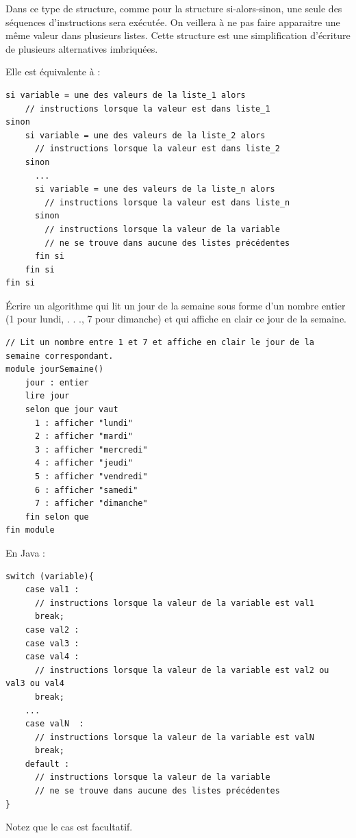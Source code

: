 \documentclass[11pt,a4paper]{article}
\begin{document}
        Dans ce type de structure, comme pour la structure si-alors-sinon, une seule des s\'equences
        d'instructions sera ex\'ecut\'ee. On veillera \`a ne pas faire apparaitre une m\^eme valeur dans
        plusieurs listes. Cette structure est une simplification d'\'ecriture de plusieurs alternatives
        imbriqu\'ees.
      
            \par
        
        Elle est \'equivalente \`a : 
      
            \par
        \begin{verbatim}
si variable = une des valeurs de la liste_1 alors
    // instructions lorsque la valeur est dans liste_1
sinon
    si variable = une des valeurs de la liste_2 alors
      // instructions lorsque la valeur est dans liste_2
    sinon
      ...
      si variable = une des valeurs de la liste_n alors
        // instructions lorsque la valeur est dans liste_n
      sinon
        // instructions lorsque la valeur de la variable
        // ne se trouve dans aucune des listes précédentes
      fin si
    fin si
fin si
      \end{verbatim}
        \'Ecrire un algorithme qui lit un jour de la semaine sous forme d'un nombre entier (1 pour
        lundi, . . ., 7 pour dimanche) et qui affiche en clair ce jour de la semaine.
      
            \par
        \begin{verbatim}
// Lit un nombre entre 1 et 7 et affiche en clair le jour de la semaine correspondant.
module jourSemaine()
    jour : entier
    lire jour
    selon que jour vaut
      1 : afficher "lundi"
      2 : afficher "mardi"
      3 : afficher "mercredi"
      4 : afficher "jeudi"
      5 : afficher "vendredi"
      6 : afficher "samedi"
      7 : afficher "dimanche"
    fin selon que
fin module
    \end{verbatim}En Java :
            \par
        \begin{verbatim}
switch (variable){
    case val1 :
      // instructions lorsque la valeur de la variable est val1
      break;
    case val2 :
    case val3 :
    case val4 :
      // instructions lorsque la valeur de la variable est val2 ou val3 ou val4
      break;
    ...
    case valN  :
      // instructions lorsque la valeur de la variable est valN
      break;
    default :
      // instructions lorsque la valeur de la variable
      // ne se trouve dans aucune des listes précédentes
}
      \end{verbatim}Notez que le cas \verb@default@ est facultatif.
            \par
        
\end{document}

